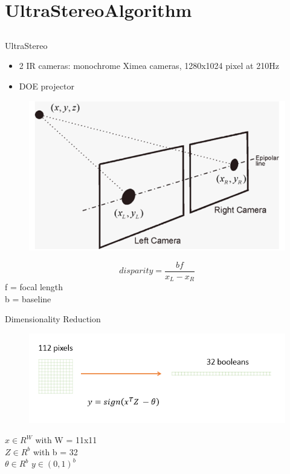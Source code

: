 %
%
\section{UltraStereoAlgorithm}
\subsection{}

\begin{frame}{UltraStereo}
\begin{itemize}
\item 2 IR cameras: monochrome Ximea cameras, 1280x1024 pixel at 210Hz
\item DOE projector
\end{itemize}
\end{frame}

\begin{frame}

\begin{figure}
\includegraphics[scale=0.5]{pictures/disp}
\end{figure}
\begin{equation}
disparity = \frac{bf}{x_{L}- x_{R}}
\end{equation}
f = focal length\\
b = baseline
\end{frame}

\begin{frame}{Dimensionality Reduction}
\begin{figure}
\includegraphics[scale=0.6]{pictures/patches}
\end{figure}
$ x \in R^{W} $  with W = 11x11\\
$ Z \in R^{b} $ with b = 32\\
$ \theta \in R^b$
$ y \in (0,1)^{b}$
\end{frame}

